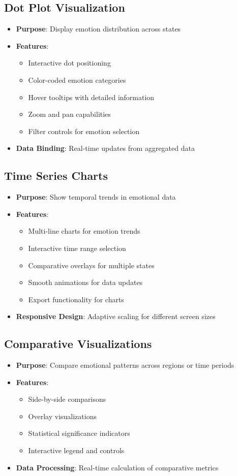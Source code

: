 \subsection{Dot Plot Visualization}
\begin{itemize}
\item \textbf{Purpose}: Display emotion distribution across states
\item \textbf{Features}:
  \begin{itemize}
  \item Interactive dot positioning
  \item Color-coded emotion categories
  \item Hover tooltips with detailed information
  \item Zoom and pan capabilities
  \item Filter controls for emotion selection
  \end{itemize}
\item \textbf{Data Binding}: Real-time updates from aggregated data
\end{itemize}

\subsection{Time Series Charts}
\begin{itemize}
\item \textbf{Purpose}: Show temporal trends in emotional data
\item \textbf{Features}:
  \begin{itemize}
  \item Multi-line charts for emotion trends
  \item Interactive time range selection
  \item Comparative overlays for multiple states
  \item Smooth animations for data updates
  \item Export functionality for charts
  \end{itemize}
\item \textbf{Responsive Design}: Adaptive scaling for different screen sizes
\end{itemize}

\subsection{Comparative Visualizations}
\begin{itemize}
\item \textbf{Purpose}: Compare emotional patterns across regions or time periods
\item \textbf{Features}:
  \begin{itemize}
  \item Side-by-side comparisons
  \item Overlay visualizations
  \item Statistical significance indicators
  \item Interactive legend and controls
  \end{itemize}
\item \textbf{Data Processing}: Real-time calculation of comparative metrics
\end{itemize}

